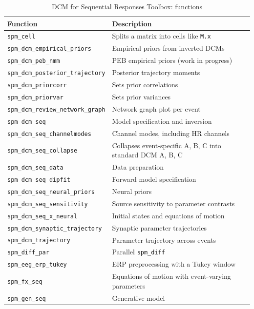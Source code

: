 \begin{table}[htbp]
\centering
\caption{DCM for Sequential Responses Toolbox: functions}
\label{tab:dcm_seq_functions}
\begin{tabular}{ll}
\toprule
Function & Description \\
\midrule
\texttt{spm\_cell} & Splits a matrix into cells like \texttt{M.x} \\
\texttt{spm\_dcm\_empirical\_priors} & Empirical priors from inverted DCMs \\
\texttt{spm\_dcm\_peb\_nmm} & PEB empirical priors (work in progress) \\
\texttt{spm\_dcm\_posterior\_trajectory} & Posterior trajectory moments \\
\texttt{spm\_dcm\_priorcorr} & Sets prior correlations \\
\texttt{spm\_dcm\_priorvar} & Sets prior variances \\
\texttt{spm\_dcm\_review\_network\_graph} & Network graph plot per event \\
\texttt{spm\_dcm\_seq} & Model specification and inversion \\
\texttt{spm\_dcm\_seq\_channelmodes} & Channel modes, including HR channels \\
\texttt{spm\_dcm\_seq\_collapse} & Collapses event-specific A, B, C into standard DCM A, B, C \\
\texttt{spm\_dcm\_seq\_data} & Data preparation \\
\texttt{spm\_dcm\_seq\_dipfit} & Forward model specification \\
\texttt{spm\_dcm\_seq\_neural\_priors} & Neural priors \\
\texttt{spm\_dcm\_seq\_sensitivity} & Source sensitivity to parameter contrasts \\
\texttt{spm\_dcm\_seq\_x\_neural} & Initial states and equations of motion \\
\texttt{spm\_dcm\_synaptic\_trajectory} & Synaptic parameter trajectories \\
\texttt{spm\_dcm\_trajectory} & Parameter trajectory across events \\
\texttt{spm\_diff\_par} & Parallel \texttt{spm\_diff} \\
\texttt{spm\_eeg\_erp\_tukey} & ERP preprocessing with a Tukey window \\
\texttt{spm\_fx\_seq} & Equations of motion with event-varying parameters \\
\texttt{spm\_gen\_seq} & Generative model \\

\end{tabular}
\end{table}
